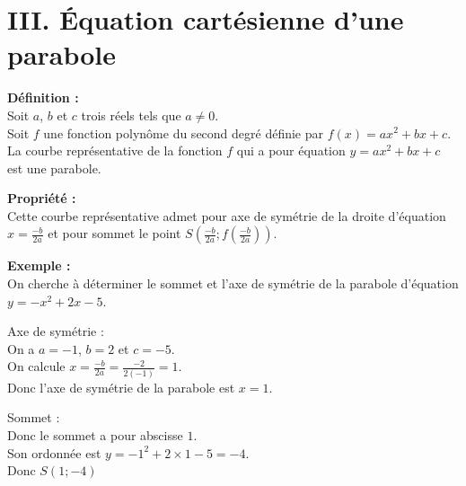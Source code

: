 \documentclass[11pt,a4paper]{article}
\begin{document}
\section*{III. Équation cartésienne d'une parabole}

\begin{mdframed}[style=definitionStyle]
  \textbf{Définition :} ~\\
  Soit $a$, $b$ et $c$ trois réels tels que $a\not=0$. \\
  Soit $f$ une fonction polynôme du second degré définie par $f(x)=ax^2+bx+c$.
  La courbe représentative de la fonction $f$ qui a pour équation $y=ax^2+bx+c$ est une parabole.
\end{mdframed}

\begin{mdframed}[style=proprieteStyle]
  \textbf{Propriété :} ~\\
  Cette courbe représentative admet pour axe de symétrie de la droite d'équation $\displaystyle x=\frac{-b}{2a}$ et pour sommet le point $\displaystyle S\left(\frac{-b}{2a};f\left(\frac{-b}{2a}\right)\right)$.
\end{mdframed}

\textbf{Exemple :} ~\\
On cherche à déterminer le sommet et l'axe de symétrie de la parabole d'équation $y=-x^2+2x-5$. \\

\begin{minipage}{0.5\textwidth}
  Axe de symétrie : \\
  On a $a=-1$, $b=2$ et $c=-5$. \\
  On calcule $\displaystyle x=\frac{-b}{2a}=\frac{-2}{2(-1)}=1$. \\
  Donc l'axe de symétrie de la parabole est $x=1$. \\
\end{minipage}
\hfill
\begin{minipage}{0.5\textwidth}
  Sommet : \\
  Donc le sommet a pour abscisse $1$. \\
  Son ordonnée est $y=-1^2+2\times1-5=-4$. \\
  Donc $S\left(1;-4\right)$
  \vspace*{20pt}
\end{minipage}
\end{document}
